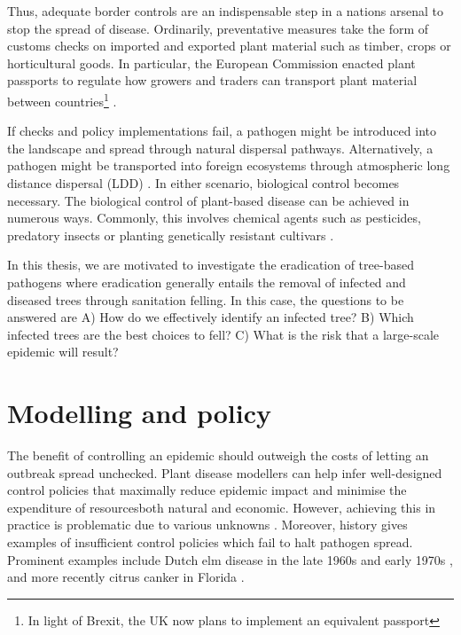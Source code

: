 Thus, adequate border controls are an indispensable step in a nations arsenal to stop the spread of disease.
Ordinarily, preventative measures take the form of customs checks on imported and exported plant material such
as timber, crops or horticultural goods. In particular, the European Commission enacted plant passports to regulate
how growers and traders can transport plant material between countries\footnote{In light of Brexit, the UK now plans
to implement an equivalent passport} \cite{wulfert2010implementation}.

If checks and policy implementations fail, a pathogen might be introduced into the landscape and spread through natural
dispersal pathways. Alternatively, a pathogen might be transported into foreign ecosystems through atmospheric 
long distance dispersal (LDD) \cite{brown2002aerial}. In either scenario, biological control becomes necessary. 
The biological control of plant-based disease
can be achieved in numerous ways. Commonly, this involves chemical agents such as pesticides, predatory insects or planting
genetically resistant cultivars \cite{pal2006biological, baker1974biological}. 

In this thesis, we are motivated to investigate the eradication of tree-based pathogens 
where eradication generally entails the removal of infected and diseased trees through sanitation felling. 
In this case, the questions to be answered are A) How do we effectively identify an infected tree? B) 
Which infected trees are the best choices to fell? C) What is the risk that a large-scale epidemic will result?


\section{Modelling and policy}
\label{sec:modelling-and-policy}


The benefit of controlling an epidemic should outweigh the costs of letting an outbreak spread unchecked. 
Plant disease modellers can help infer well-designed control policies that maximally reduce epidemic impact and minimise the expenditure
of resources\textemdash both natural and economic. However, achieving this in practice is problematic due to various unknowns \cite{13-challenges}.
Moreover, history gives examples of insufficient control policies which fail to halt pathogen spread. 
Prominent examples include Dutch elm disease in the late 1960s and early 1970s \cite{dutch-elm-mismanage}, 
and more recently citrus canker in Florida \cite{schubert2001meeting}.


